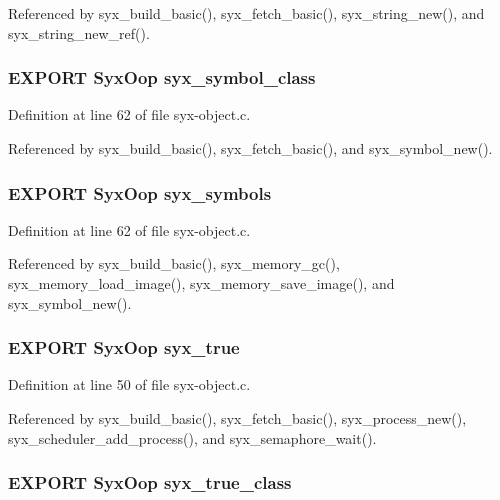 Referenced by syx\_\-build\_\-basic(), syx\_\-fetch\_\-basic(), syx\_\-string\_\-new(), and syx\_\-string\_\-new\_\-ref().\hypertarget{syx-object_8h_e10f18ec5e45484612b5a7fe6b96518d}{
\subsubsection{\setlength{\rightskip}{0pt plus 5cm}EXPORT {\bf SyxOop} {\bf syx\_\-symbol\_\-class}}}
\label{syx-object_8h_e10f18ec5e45484612b5a7fe6b96518d}




Definition at line 62 of file syx-object.c.

Referenced by syx\_\-build\_\-basic(), syx\_\-fetch\_\-basic(), and syx\_\-symbol\_\-new().\hypertarget{syx-object_8h_f0e4dafb84c01e0dcd5a7bc7b800594e}{
\subsubsection{\setlength{\rightskip}{0pt plus 5cm}EXPORT {\bf SyxOop} {\bf syx\_\-symbols}}}
\label{syx-object_8h_f0e4dafb84c01e0dcd5a7bc7b800594e}




Definition at line 62 of file syx-object.c.

Referenced by syx\_\-build\_\-basic(), syx\_\-memory\_\-gc(), syx\_\-memory\_\-load\_\-image(), syx\_\-memory\_\-save\_\-image(), and syx\_\-symbol\_\-new().\hypertarget{syx-object_8h_ac2fe13e9bd66770ef58d98f2be8629d}{
\subsubsection{\setlength{\rightskip}{0pt plus 5cm}EXPORT {\bf SyxOop} {\bf syx\_\-true}}}
\label{syx-object_8h_ac2fe13e9bd66770ef58d98f2be8629d}




Definition at line 50 of file syx-object.c.

Referenced by syx\_\-build\_\-basic(), syx\_\-fetch\_\-basic(), syx\_\-process\_\-new(), syx\_\-scheduler\_\-add\_\-process(), and syx\_\-semaphore\_\-wait().\hypertarget{syx-object_8h_9b2ffeb8a5dee3abb1ae31543cea132f}{
\subsubsection{\setlength{\rightskip}{0pt plus 5cm}EXPORT {\bf SyxOop} {\bf syx\_\-true\_\-class}}}
\label{syx-object_8h_9b2ffeb8a5dee3abb1ae31543cea132f}




